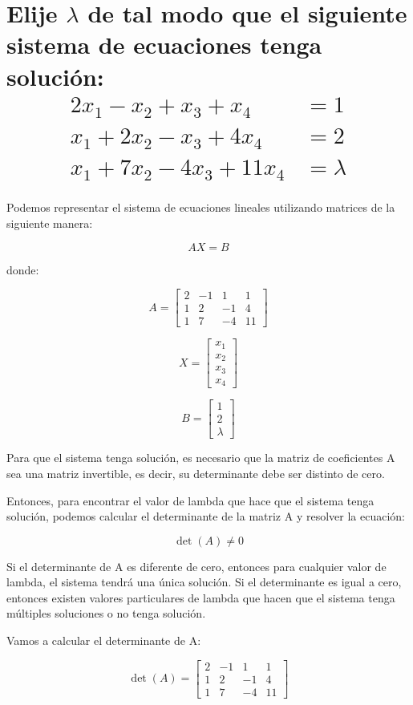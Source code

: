 \section{Elije $\lambda$ de tal modo que el siguiente sistema de ecuaciones tenga solución:
\begin{align*}
2x_1 - x_2 + x_3 + x_4 &= 1 \\
x_1 + 2x_2 - x_3 + 4x_4 &= 2 \\
x_1 + 7x_2 - 4x_3 + 11x_4 &= \lambda
\end{align*}}

Podemos representar el sistema de ecuaciones lineales utilizando matrices de la siguiente manera:

\[ AX = B \]

donde:

\[ A = \begin{bmatrix} 
2 & -1 & 1 & 1 \\
1 & 2 & -1 & 4 \\
1 & 7 & -4 & 11
\end{bmatrix} \]

\[ X = \begin{bmatrix} 
x_1 \\
x_2 \\
x_3 \\
x_4
\end{bmatrix} \]

\[ B = \begin{bmatrix} 
1 \\
2 \\
\lambda
\end{bmatrix} \]

Para que el sistema tenga solución, es necesario que la matriz de coeficientes A sea una matriz invertible, es decir, su determinante debe ser distinto de cero.

Entonces, para encontrar el valor de lambda que hace que el sistema tenga solución, podemos calcular el determinante de la matriz A y resolver la ecuación:

\[ \det(A) \neq 0 \]

Si el determinante de A es diferente de cero, entonces para cualquier valor de lambda, el sistema tendrá una única solución. Si el determinante es igual a cero, entonces existen valores particulares de lambda que hacen que el sistema tenga múltiples soluciones o no tenga solución.

Vamos a calcular el determinante de A:

\[ \det(A) = \begin{bmatrix} 
2 & -1 & 1 & 1 \\
1 & 2 & -1 & 4 \\
1 & 7 & -4 & 11
\end{bmatrix} \]

